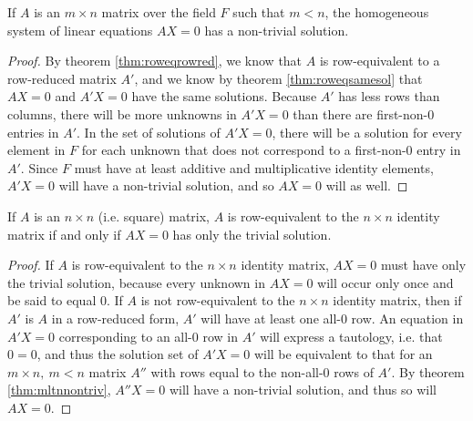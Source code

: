 \documentclass[12pt]{article}
\begin{document}
\begin{thm} \label{thm:mltnnontriv}
  If $A$ is an $m \times n$ matrix over the field $F$ such that
  $m < n$, the homogeneous system of linear equations $AX = 0$
  has a non-trivial solution.
  \begin{proof}
    By theorem \ref{thm:roweqrowred}, we know that $A$ is
    row-equivalent to a row-reduced matrix $A'$, and we know by
    theorem \ref{thm:roweqsamesol} that $AX = 0$ and $A'X = 0$
    have the same solutions. Because $A'$ has less rows than
    columns, there will be more unknowns in $A'X = 0$ than there
    are first-non-0 entries in $A'$. In the set of solutions of
    $A'X = 0$, there will be a solution for every element in $F$
    for each unknown that does not correspond to a first-non-0
    entry in $A'$. Since $F$ must have at least additive and
    multiplicative identity elements, $A'X = 0$ will have a
    non-trivial solution, and so $AX = 0$ will as well.
  \end{proof}
\end{thm}

\begin{thm}
  If $A$ is an $n \times n$ (i.e. square) matrix, $A$ is
  row-equivalent to the $n \times n$ identity matrix if and only
  if $AX = 0$ has only the trivial solution.
  \begin{proof}
    If $A$ is row-equivalent to the $n \times n$ identity matrix,
    $AX = 0$ must have only the trivial solution, because every
    unknown in $AX = 0$ will occur only once and be said to equal
    $0$. If $A$ is not row-equivalent to the $n \times n$
    identity matrix, then if $A'$ is $A$ in a row-reduced form,
    $A'$ will have at least one all-0 row. An equation in $A'X =
    0$ corresponding to an all-0 row in $A'$ will express a
    tautology, i.e. that $0 = 0$, and thus the solution set of
    $A'X = 0$ will be equivalent to that for an $m \times n,\ m <
    n$ matrix $A''$ with rows equal to the non-all-0 rows of
    $A'$. By theorem \ref{thm:mltnnontriv}, $A''X = 0$ will have
    a non-trivial solution, and thus so will $AX = 0$.
  \end{proof}
\end{thm}
\end{document}
